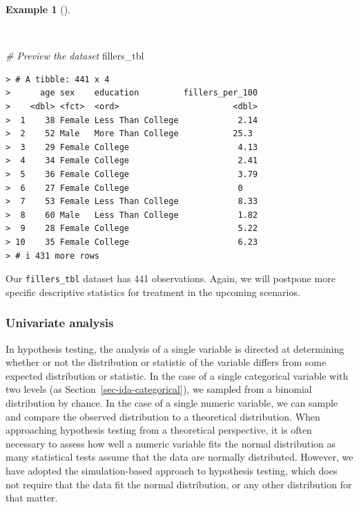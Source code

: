 \documentclass[
  letterpaper,
]{latex/krantz}
\newenvironment{Shaded}{\begin{snugshade}}{\end{snugshade}}
\newcommand{\CommentTok}[1]{\textcolor[rgb]{0.00,0.00,0.00}{\textit{#1}}}
\newcommand{\NormalTok}[1]{\textcolor[rgb]{0.00,0.00,0.00}{#1}}
\theoremstyle{definition}
\newtheorem{example}{Example}[chapter]
\theoremstyle{remark}
\begin{document}
\begin{example}[]\protect\hypertarget{exm-ida-num-dataset}{}\label{exm-ida-num-dataset}

~

\begin{Shaded}
\begin{Highlighting}[]
\CommentTok{\# Preview the dataset}
\NormalTok{fillers\_tbl}
\end{Highlighting}
\end{Shaded}

\begin{verbatim}
> # A tibble: 441 x 4
>      age sex    education         fillers_per_100
>    <dbl> <fct>  <ord>                       <dbl>
>  1    38 Female Less Than College            2.14
>  2    52 Male   More Than College           25.3 
>  3    29 Female College                      4.13
>  4    34 Female College                      2.41
>  5    36 Female College                      3.79
>  6    27 Female College                      0   
>  7    53 Female Less Than College            8.33
>  8    60 Male   Less Than College            1.82
>  9    28 Female College                      5.22
> 10    35 Female College                      6.23
> # i 431 more rows
\end{verbatim}

\end{example}

Our \texttt{fillers\_tbl} dataset has 441 observations. Again, we will
postpone more specific descriptive statistics for treatment in the
upcoming scenarios.

\subsubsection{Univariate analysis}\label{univariate-analysis}

In hypothesis testing, the analysis of a single variable is directed at
determining whether or not the distribution or statistic of the variable
differs from some expected distribution or statistic. In the case of a
single categorical variable with two levels (as
Section~\ref{sec-ida-categorical}), we sampled from a binomial
distribution by chance. In the case of a single numeric variable, we can
sample and compare the observed distribution to a theoretical
distribution. When approaching hypothesis testing from a theoretical
perspective, it is often necessary to assess how well a numeric variable
fits the normal distribution as many statistical tests assume that the
data are normally distributed. However, we have adopted the
simulation-based approach to hypothesis testing, which does not require
that the data fit the normal distribution, or any other distribution for
that matter.
\end{document}
